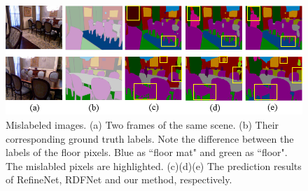 \begin{figure}[!htbp]
	\setlength{\abovecaptionskip}{-0.2cm}
	\setlength{\belowcaptionskip}{-10cm}
	\centering
	\includegraphics[scale=0.4]{figure/Mislabels.png}
	\caption{Mislabeled images. (a) Two frames of the same scene. (b) Their corresponding ground truth labels. Note the difference between the labels of the floor pixels. Blue as ``floor mat" and green as ``floor".  The mislabled pixels are highlighted. (c)(d)(e) The prediction results of RefineNet, RDFNet and our method, respectively.}
	\label{fig:mislabels}
\end{figure}
%







